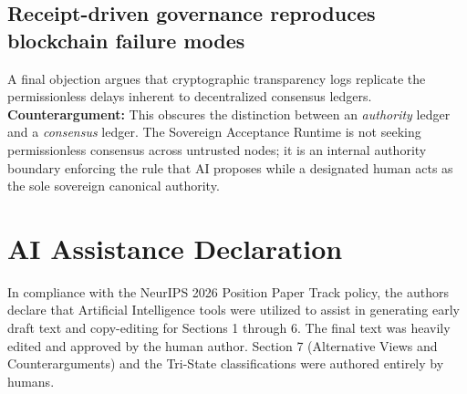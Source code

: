 \documentclass{article}
\begin{document}
\subsection{Receipt-driven governance reproduces blockchain failure modes}
A final objection argues that cryptographic transparency logs replicate the permissionless delays inherent to decentralized consensus ledgers. \textbf{Counterargument:} This obscures the distinction between an \textit{authority} ledger and a \textit{consensus} ledger. The Sovereign Acceptance Runtime is not seeking permissionless consensus across untrusted nodes; it is an internal authority boundary enforcing the rule that AI proposes while a designated human acts as the sole sovereign canonical authority.

\section*{AI Assistance Declaration}
In compliance with the NeurIPS 2026 Position Paper Track policy, the authors declare that Artificial Intelligence tools were utilized to assist in generating early draft text and copy-editing for Sections 1 through 6. The final text was heavily edited and approved by the human author. Section 7 (Alternative Views and Counterarguments) and the Tri-State classifications were authored entirely by humans.



\end{document}
